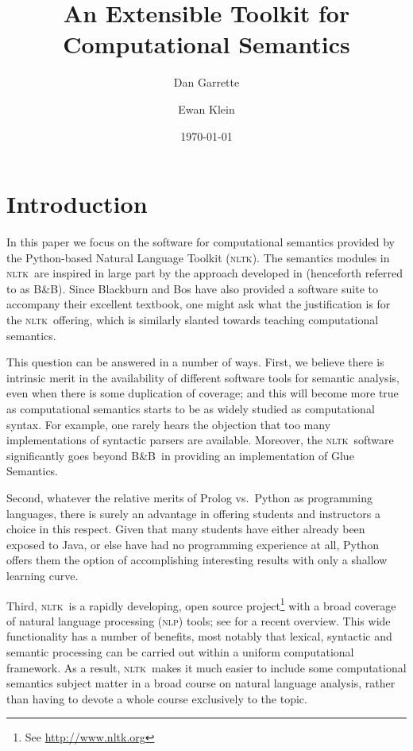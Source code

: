 \documentclass[11pt, a4paper]{article}
\newcommand{\BB}{\textsc{B{\small\&}B}}
\newcommand{\NLP}{\textsc{nlp}}
\newcommand{\NLTK}{\textsc{nltk}}
\begin{document}
\title{An Extensible Toolkit for Computational Semantics}
\author{Dan Garrette \and Ewan Klein}
\date{\today}

\maketitle

\section{Introduction}

In this paper we focus on the software for computational semantics provided
by the Python-based Natural Language Toolkit (\NLTK). The semantics
modules in \NLTK\ are
inspired in large part by the approach developed in \citet{BB}
(henceforth referred to as \BB).
Since Blackburn and Bos have also provided a software suite to
accompany their excellent textbook, one might ask what the
justification is for the \NLTK\ offering, which is similarly slanted
towards teaching computational semantics.

This question can be answered in a number of ways. First, we believe
there is intrinsic merit in the availability of different software
tools for semantic analysis, even when there is some duplication of
coverage; and this will become more true as computational semantics
starts to be as widely studied as computational syntax. For example, 
one rarely hears the objection that too many implementations of 
syntactic parsers are available.  Moreover, the \NLTK\ software 
significantly goes beyond \BB\ in providing an implementation of 
Glue Semantics.

Second, whatever the relative merits of Prolog vs.\ Python as
programming languages, there is surely an advantage in offering
students and instructors a choice in this respect. Given that many
students have either already been exposed to Java, or else have had no
programming experience at all, Python offers them the option of
accomplishing interesting results with only a shallow
learning curve.

Third, \NLTK\ is a rapidly developing, open source
project\footnote{See \url{http://www.nltk.org}} with a broad coverage of
natural language processing (\NLP) tools; see \citet{Multidisciplinary} for
a recent overview. This wide functionality has a number of benefits,
most notably that lexical, syntactic and semantic processing can be
carried out within a uniform computational framework. As a result,
\NLTK\ makes it much easier to include some computational semantics
subject matter in
a broad course on natural language analysis, rather than having to
devote a whole course exclusively to the topic.
\end{document}
